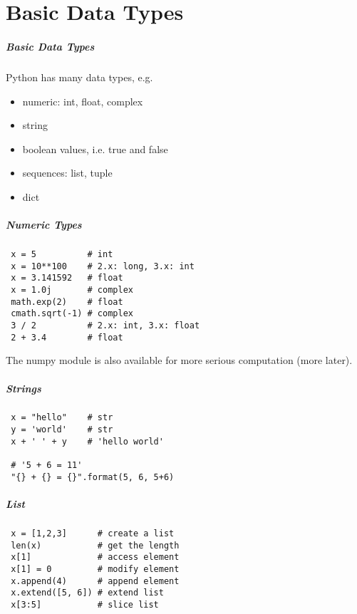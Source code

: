 \documentclass[hyperref={colorlinks, linkcolor=blue, urlcolor=blue}]{beamer}
\begin{document}
\part{Basic Data Types} 

\begin{frame}
  \frametitle{Basic Data Types}

  Python has many data types, e.g.
  \begin{itemize}
  \item numeric: int, float, complex
  \item string
  \item boolean values, i.e. true and false
  \item sequences: list, tuple
  \item dict
  \end{itemize}
\end{frame}

\begin{frame}[fragile]
  \frametitle{Numeric Types}

  \begin{lstlisting}
 x = 5          # int
 x = 10**100    # 2.x: long, 3.x: int
 x = 3.141592   # float
 x = 1.0j       # complex
 math.exp(2)    # float
 cmath.sqrt(-1) # complex
 3 / 2          # 2.x: int, 3.x: float
 2 + 3.4        # float
  \end{lstlisting}
  The numpy module is also available for more serious computation (more later).
\end{frame}

\begin{frame}[fragile]
  \frametitle{Strings}

  \begin{lstlisting}
 x = "hello"    # str
 y = 'world'    # str
 x + ' ' + y    # 'hello world'
 
 # '5 + 6 = 11'
 "{} + {} = {}".format(5, 6, 5+6)
  \end{lstlisting}
\end{frame}

\begin{frame}[fragile]
  \frametitle{List}

  \begin{lstlisting}
 x = [1,2,3]      # create a list
 len(x)           # get the length
 x[1]             # access element
 x[1] = 0         # modify element
 x.append(4)      # append element
 x.extend([5, 6]) # extend list
 x[3:5]           # slice list
  \end{lstlisting}
\end{frame}
\end{document}
